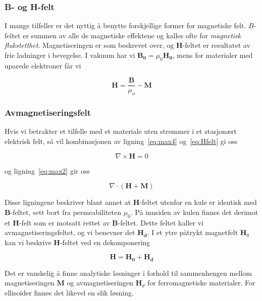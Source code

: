 \documentclass[a4paper,11pt, twocolumn]{article}
\begin{document}
\subsubsection{B- og H-felt}
I mange tilfeller er det nyttig å benytte forskjellige former for magnetiske felt. $B$-feltet er summen av alle de magnetiske effektene og kalles ofte for \textit{magnetisk flukstetthet}. Magnetiseringen er som beskrevet over, og $\mathbf{H}$-feltet er resultatet av frie ladninger i bevegelse. 
I vakuum har vi $\mathbf{B_0} = \mu_0 \mathbf{H_0}$, mens for materialer med uparede elektroner får vi

\begin{equation}
	\mathbf{H}=\frac{\mathbf{B}}{\mu_o}-\mathbf{M}
	\label{eq:Hfelt}
\end{equation}

\subsubsection{Avmagnetiseringsfelt}
Hvis vi betrakter et tilfelle med et materiale uten strømmer i et stasjonært elektrisk felt, så vil kombinasjonen av ligning~\ref{eq:max4} og~\ref{eq:Hfelt} gi oss

\begin{equation}
	\nabla\times\mathbf{H} = 0
	\label{eq:ampereAlternativ}
\end{equation}

og ligning~\ref{eq:max2} gir oss

\begin{equation}
	\nabla\cdot(\mathbf{H}+\mathbf{M})
	\label{eq:gaussAlternativ}
\end{equation}

Disse ligningene beskriver blant annet at $\mathbf H$-feltet utenfor en kule er identisk med $\mathbf B$-feltet, sett bort fra permeabiliteten $\mu_0$. På innsiden av kulen finnes det derimot et $\mathbf H$-felt som er motsatt rettet av $\mathbf B$-feltet. Dette feltet kaller vi avmagnetiseringsfeltet, og vi benevner det $\mathbf{H_d}$. I et ytre påtrykt magnetfelt $\mathbf H_0$ kan vi beskrive $\mathbf H$-feltet ved en dekomponering

\begin{equation}
	\mathbf{H} = \mathbf{H_0} + \mathbf{H_d}
	\label{eq:dekomponering}
\end{equation}



Det er vanskelig å finne analytiske løsninger i forhold til sammenhengen mellom magnetiseringen $\mathbf M$ og avmagnetiseringen $\mathbf H_d$ for ferromagnetiske materialer. For ellisoider finnes det likevel en slik løsning. 
\end{document}
